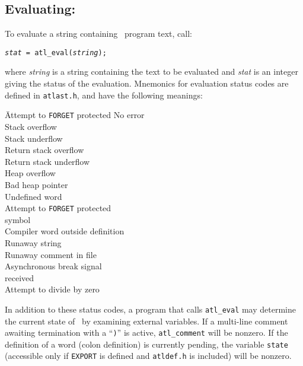 \documentclass[twocolumn]{article}
\begin{document}
\subsection{Evaluating: }

To evaluate a string containing \atlast\ program text, call:

{\tt {\em stat} = \verb+atl_eval+({\em string});}

where {\em string} is a string containing the text to be evaluated and
{\em stat} is an integer giving the status of the evaluation.
Mnemonics for evaluation status codes are defined in {\tt atlast.h},
and have the following meanings:

\begin{tabbing}
 \= Attempt to {\tt FORGET} protected \kill
{} \>          No error \\
 \>      Stack overflow \\
 \>     Stack underflow \\
 \>     Return stack overflow \\
 \>    Return stack underflow \\
 \>       Heap overflow \\
 \>     Bad heap pointer \\
 \>      Undefined word \\
 \>     Attempt to {\tt FORGET} protected \\
                \>        symbol \\
 \>       Compiler word outside definition \\
 \>      Runaway string \\
 \>        Runaway comment in file \\
 \>          Asynchronous break signal \\
           \>          received \\
 \>        Attempt to divide by zero \\
\end{tabbing}

In addition to these status codes, a program that calls
\verb+atl_eval+ may determine the current state of \atlast\ by
examining external variables.  If a multi-line comment awaiting
termination with a ``{\tt )}'' is active, \verb+atl_comment+ will be
nonzero.  If the definition of a word (colon definition) is currently
pending, the variable {\tt state} (accessible only if {\tt EXPORT} is
defined and {\tt atldef.h} is included) will be nonzero.
\end{document}
